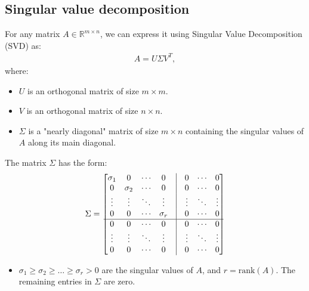 \subsection{Singular value decomposition}
\begin{intuition}
    For any matrix $A \in \mathbb{R}^{m \times n}$, we can express it using Singular Value Decomposition (SVD) as:
    \begin{align*}
        A = U \Sigma V^T,
    \end{align*}
    where:
    \begin{itemize}
        \item $U$ is an orthogonal matrix of size $m \times m$.
        \item $V$ is an orthogonal matrix of size $n \times n$.
        \item $\Sigma$ is a "nearly diagonal" matrix of size $m \times n$ containing the singular values of $A$ along its main diagonal.
    \end{itemize}

    The matrix $\Sigma$ has the form:
    \[
    \Sigma = \begin{bmatrix}
    \sigma_1 & 0       & \cdots & 0       & \vline & 0       & \cdots & 0 \\
    0       & \sigma_2 & \cdots & 0       & \vline & 0       & \cdots & 0 \\
    \vdots  & \vdots   & \ddots & \vdots  & \vline & \vdots  & \ddots & \vdots \\
    0       & 0        & \cdots & \sigma_r & \vline & 0       & \cdots & 0 \\
    \hline
    0       & 0        & \cdots & 0       & \vline & 0       & \cdots & 0 \\
    \vdots  & \vdots   & \ddots & \vdots  & \vline & \vdots  & \ddots & \vdots \\
    0       & 0        & \cdots & 0       & \vline & 0       & \cdots & 0 \\
    \end{bmatrix}
    \]
    \begin{itemize}
        \item $\sigma_1 \geq \sigma_2 \geq \dots \geq \sigma_r > 0$ are the singular values of $A$, and $r = \text{rank}(A)$. The remaining entries in $\Sigma$ are zero.
    \end{itemize}
\end{intuition}

